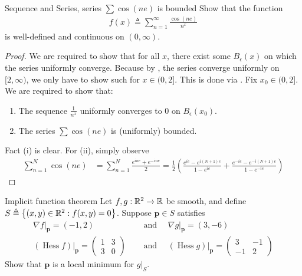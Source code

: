 \documentclass{report}
\begin{document}
\begin{question}{Sequence and Series, series $\sum \cos (ne)$ is bounded }{}
Show that the function 
\begin{align*}
f(x)\triangleq \sum_{n=1}^{\infty}  \frac{\cos (ne)}{n^x}
\end{align*}
is well-defined and continuous on $(0,\infty)$. 
\end{question}
\begin{proof}
  We are required to show that for all $x$, there exist some  $B_\epsilon (x)$ on which the series uniformly converge. Because by , the series converge uniformly on $[2,\infty)$, we only have to show such for $x \in (0,2]$. This is done via . Fix $x_0 \in (0,2]$. We are required to show that:
\begin{enumerate}[label=(\roman*)]
  \item The sequence $\frac{1}{n^x}$ uniformly converges to $0$ on  $B_\epsilon (x_0)$. 
  \item The series $\sum \cos (ne)$ is (uniformly) bounded.  
\end{enumerate}
Fact (i) is clear. For (ii), simply observe 
\begin{align*}
\sum_{n=1}^N \cos (ne)&= \sum_{n=1}^N \frac{e^{ine}+ e^{-ine}}{2} = \frac{1}{2} \left(  \frac{e^{ie}-e^{i(N+1)e}}{1-e^{ie}}+ \frac{e^{-ie}-e^{-i(N+1)e}}{1-e^{-ie}} \right) 
\end{align*}
\end{proof}
\begin{question}{Implicit function theorem}{}
Let $f,g:\mathbb{R}^2 \rightarrow \mathbb{R}$ be smooth, and define $S\triangleq \left\{ (x,y)\in\mathbb{R}^2: f(x,y)=0 \right\}$. Suppose $\textbf{p}\in S$ satisfies 
\begin{align*}
  \nabla f|_\textbf{p}= (-1,2)\quad &\text{ and }\quad \nabla g |_\textbf{p} = (3,-6) \\
\left(\operatorname{Hess}f \right)|_{\textbf{p}}  = \begin{pmatrix} 
 1 & 3 \\
 3 & 0
 \end{pmatrix}  \quad &\text{ and }\quad \left(\operatorname{Hess}g \right)|_\textbf{p} = \begin{pmatrix} 
 3 & -1 \\
 -1 & 2
\end{pmatrix}  
\end{align*}
Show that $\textbf{p}$ is a local minimum for  $g|_S$. 
\end{question}
\end{document}
